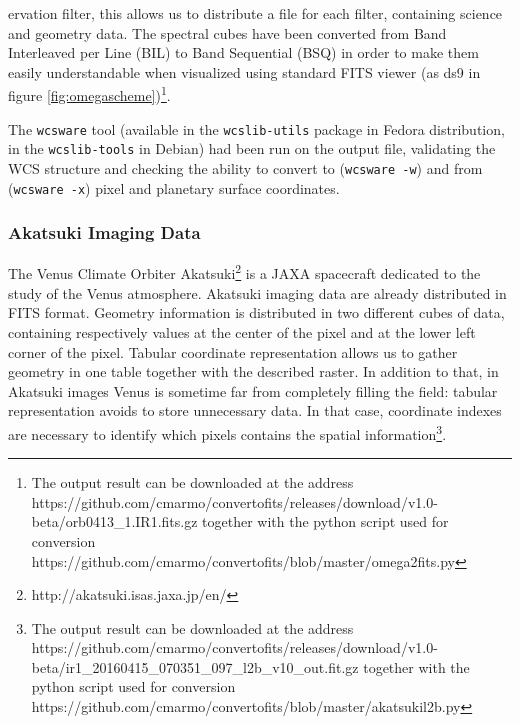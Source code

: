 ervation filter, this allows
us to distribute a file for each filter, containing science and geometry data.
The spectral cubes have been converted from Band Interleaved per Line (BIL) to Band
Sequential (BSQ) in order to make them easily understandable when visualized using
standard FITS viewer (as ds9 in figure \ref{fig:omegascheme})\footnote{The output result can be downloaded at the address https://github.com/cmarmo/convertofits/releases/download/v1.0-beta/orb0413\_1.IR1.fits.gz together with the python script used for conversion https://github.com/cmarmo/convertofits/blob/master/omega2fits.py}.

The \texttt{wcsware} tool (available in the \texttt{wcslib-utils} package in Fedora
distribution, in the \texttt{wcslib-tools} in Debian) had been run on the output file,
validating the WCS structure and checking the ability to convert to
(\texttt{wcsware -w}) and from (\texttt{wcsware -x}) pixel and planetary surface
coordinates.

\subsubsection{Akatsuki Imaging Data}
The Venus Climate Orbiter Akatsuki\footnote{http://akatsuki.isas.jaxa.jp/en/} is a JAXA
spacecraft dedicated to the study of the Venus atmosphere.
Akatsuki imaging data are already distributed in FITS format.
Geometry information is distributed in two different cubes of data, containing
respectively values at the center of the pixel and at the lower left corner of the
pixel.
Tabular coordinate representation allows us to gather geometry in one table together
with the described raster.
In addition to that, in Akatsuki images Venus is sometime far from completely filling
the field: tabular representation avoids to store unnecessary data. 
In that case, coordinate indexes are necessary to identify which pixels contains the
spatial information\footnote{The output result can be downloaded at the address https://github.com/cmarmo/convertofits/releases/download/v1.0-beta/ir1\_20160415\_070351\_097\_l2b\_v10\_out.fit.gz together with the python script used for conversion https://github.com/cmarmo/convertofits/blob/master/akatsukil2b.py}.

